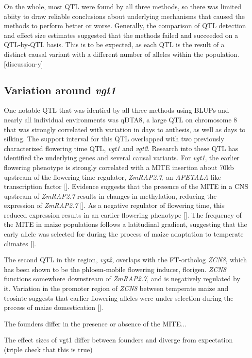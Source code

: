 \documentclass[article,9pt,twocolumn,twoside]{rilabRxiv}
\begin{document}
On the whole, most QTL were found by all three methods, so there was limited abiity to draw reliable conclusions about underlying mechanisms that caused the methods to perform better or worse.
Generally, the comparison of QTL detection and effect size estimates suggested that the methods failed and succeeded on a QTL-by-QTL basis.
This is to be expected, as each QTL is the result of a distinct causal variant with a different number of alleles within the population. [discussion-y]

\subsection{Variation around \emph{vgt1}}
One notable QTL that was identied by all three methods using BLUPs and nearly all individual environments was qDTA8, a large QTL on chromosome 8 that was strongly correlated with variation in days to anthesis, as well as days to silking.
The support interval for this QTL overlapped with two previously characterized flowering time QTL, \emph{vgt1} and \emph{vgt2}.
Research into these QTL has identified the underlying genes and several causal variants.
For \emph{vgt1}, the earlier flowering phenotype is strongly correlated with a MITE insertion about 70kb upstream of the flowering time regulator, \emph{ZmRAP2.7}, an \emph{APETALA}-like transcription factor [].
Evidence suggests that the presence of the MITE in a CNS upstream of \emph{ZmRAP2.7} results in changes in methylation, reducing the expression of \emph{ZmRAP2.7} [].
As a negative regulator of flowering time, this reduced expression results in an earlier flowering phenotype [].
The frequency of the MITE in maize populations follows a latitudinal gradient, suggesting that the early allele was selected for during the process of maize adaptation to temperate climates [].

The second QTL in this region, \emph{vgt2}, overlaps with the FT-ortholog \emph{ZCN8}, which has been shown to be the phloem-mobile flowering inducer, florigen.
\emph{ZCN8} functions somewhere downstream of \emph{ZmRAP2.7}, and is negatively regulated by it.
Variation in the promoter region of \emph{ZCN8} between temperate maize and teosinte suggests that earlier flowering alleles were under selection during the precess of maize domestication [].

The founders differ in the presence or absence of the MITE...

The effect sizes of vgt1 differ between founders and diverge from expectation (triple check that this is true)
\end{document}
